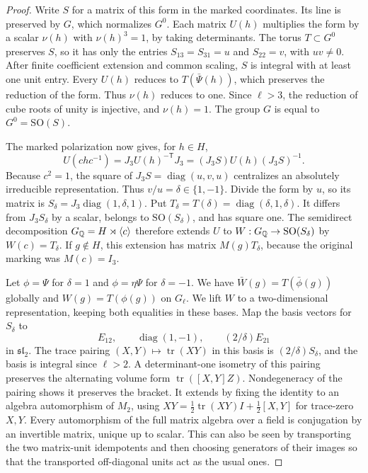 \documentclass[a4paper,11pt]{article}
\theoremstyle{definition}
\theoremstyle{remark}
\numberwithin{equation}{section}
\begin{document}
\begin{proof}
Write \(S\) for a matrix of this form in the marked coordinates. Its line is preserved by \(G\), which normalizes \(G^0\). Each matrix \(U(h)\) multiplies the form by a scalar \(\nu(h)\) with \(\nu(h)^3=1\), by taking determinants. The torus \(T\subset G^0\) preserves \(S\), so it has only the entries \(S_{13}=S_{31}=u\) and \(S_{22}=v\), with \(uv\ne0\). After finite coefficient extension and common scaling, \(S\) is integral with at least one unit entry. Every \(U(h)\) reduces to \(T(\bar\Psi(h))\), which preserves the reduction of the form. Thus \(\nu(h)\) reduces to one. Since \(\ell>3\), the reduction of cube roots of unity is injective, and \(\nu(h)=1\). The group \(G\) is equal to \(G^0=\mathrm{SO}(S)\).

The marked polarization now gives, for \(h\in H\),
\[
  U(chc^{-1})=J_3 U(h)^{-\mathsf T}J_3
             =(J_3S)U(h)(J_3S)^{-1}.
\]
Because \(c^2=1\), the square of \(J_3S=\operatorname{diag}(u,v,u)\) centralizes an absolutely irreducible representation. Thus \(v/u=\delta\in\{1,-1\}\). Divide the form by \(u\), so its matrix is \(S_\delta=J_3\operatorname{diag}(1,\delta,1)\). Put \(T_\delta=T(\delta)=\operatorname{diag}(\delta,1,\delta)\). It differs from \(J_3S_\delta\) by a scalar, belongs to \(\mathrm{SO}(S_\delta)\), and has square one. The semidirect decomposition \(G_\mathbb Q=H\rtimes\langle c\rangle\) therefore extends \(U\) to \(W:G_\mathbb Q\to\mathrm{SO}(S_\delta)\) by \(W(c)=T_\delta\). If \(g\notin H\), this extension has matrix \(M(g)T_\delta\), because the original marking was \(M(c)=I_3\).

Let \(\phi=\Psi\) for \(\delta=1\) and \(\phi=\eta\Psi\) for \(\delta=-1\). We have \(\bar W(g)=T(\bar\phi(g))\) globally and \(W(g)=T(\phi(g))\) on \(G_\ell\). We lift \(W\) to a two-dimensional representation, keeping both equalities in these bases. Map the basis vectors for \(S_\delta\) to
\[
  E_{12},\qquad \operatorname{diag}(1,-1),\qquad (2/\delta)E_{21}
\]
in \(\mathfrak{sl}_2\). The trace pairing \((X,Y)\mapsto\operatorname{tr}(XY)\) in this basis is \((2/\delta)S_\delta\), and the basis is integral since \(\ell>2\). A determinant-one isometry of this pairing preserves the alternating volume form \(\operatorname{tr}([X,Y]Z)\). Nondegeneracy of the pairing shows it preserves the bracket. It extends by fixing the identity to an algebra automorphism of \(M_2\), using \(XY=\tfrac12\operatorname{tr}(XY)I+\tfrac12[X,Y]\) for trace-zero \(X,Y\). Every automorphism of the full matrix algebra over a field is conjugation by an invertible matrix, unique up to scalar. This can also be seen by transporting the two matrix-unit idempotents and then choosing generators of their images so that the transported off-diagonal units act as the usual ones.


\end{proof}
\end{document}
